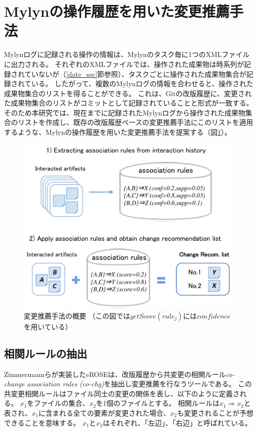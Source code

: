 \documentclass[a4paper]{jsbook}
\def\Ra{\Rightarrow}
\newcommand{\confidence}{con\!f\!idence}
\newcommand{\getScore}{getS\!core}
\begin{document}
\section{Mylynの操作履歴を用いた変更推薦手法}\label{method_sec}
Mylynログに記録される操作の情報は、Mylynのタスク毎に1つのXMLファイルに出力される。
それぞれのXMLファイルでは、操作された成果物は時系列が記録されていないが（\ref{date_sec}節参照）、タスクごとに操作された成果物集合が記録されている。
したがって、複数のMylynログの情報を合わせると、操作された成果物集合のリストを得ることができる。
これは、Gitの改版履歴に、変更された成果物集合のリストがコミットとして記録されていることと形式が一致する。
そのため本研究では、現在までに記録されたMylynログから操作された成果物集合のリストを作成し、既存の改版履歴ベースの変更推薦手法にこのリストを適用するような、Mylynの操作履歴を用いた変更推薦手法を提案する（図\ref{proposal}）。

\begin{figure}[tb]
  \centering
  \includegraphics[width = \linewidth]{resource/proposal.pdf}
  \caption{変更推薦手法の概要 （この図では$\getScore(rule_j)$には$\confidence$を用いている）}
  \label{proposal}
\end{figure}

\subsection{相関ルールの抽出}\label{extractrules_sec}
Zimmermannらが実装したeROSE\cite{Zimmermann:2005}は、改版履歴から共変更の相関ルール{\it co-change association rules (co-chg)}を抽出し変更推薦を行なうツールである。
この共変更相関ルールはファイル同士の変更の関係を表し、以下のように定義される。
$x_1$をファイルの集合、$x_2$を1個のファイルとする。
相関ルールは$x_1 \Ra x_2$と表され、$x_1$に含まれる全ての要素が変更された場合、$x_2$も変更されることが予想できることを意味する。
$x_1$と$x_2$はそれぞれ、「左辺」、「右辺」と呼ばれている。
\end{document}
